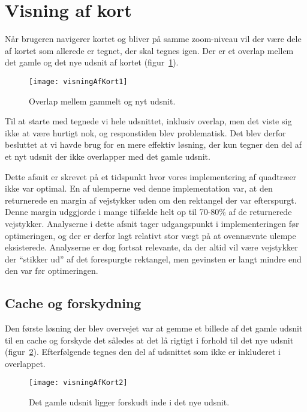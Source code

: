 \section{Visning af kort}
\label{sec:visningAfKort}

Når brugeren navigerer kortet og bliver på samme zoom-niveau vil der være dele af kortet som allerede er tegnet, der skal tegnes igen. Der er et overlap mellem det gamle og det nye udsnit af kortet (figur~\ref{figur:visningAfKort1}).

\begin{figure}[h]
	\centering
	\texttt{[image: visningAfKort1]}
	\captionsetup{width=0.8\textwidth}
	\caption{Overlap mellem gammelt og nyt udsnit.}
	\label{figur:visningAfKort1}
\end{figure}

Til at starte med tegnede vi hele udsnittet, inklusiv overlap, men det viste sig ikke at være hurtigt nok, og responstiden blev problematisk. Det blev derfor besluttet at vi havde brug for en mere effektiv løsning, der kun tegner den del af et nyt udsnit der ikke overlapper med det gamle udsnit.

Dette afsnit er skrevet på et tidspunkt hvor vores implementering af quadtræer ikke var optimal. En af ulemperne ved denne implementation var, at den returnerede en margin af vejstykker uden om den rektangel der var efterspurgt. Denne margin udggjorde i mange tilfælde helt op til 70-80\% af de returnerede vejstykker. Analyserne i dette afsnit tager udgangspunkt i implementeringen før optimeringen, og der er derfor lagt relativt stor vægt på at ovennævnte ulempe eksisterede. Analyserne er dog fortsat relevante, da der altid vil være vejstykker der ``stikker ud'' af det forespurgte rektangel, men gevinsten er langt mindre end den var før optimeringen.

\subsection{Cache og forskydning}
\label{subsec:cacheOgForskydning}

Den første løsning der blev overvejet var at gemme et billede af det gamle udsnit til en cache og forskyde det således at det lå rigtigt i forhold til det nye udsnit (figur~\ref{figur:visningAfKort2}). Efterfølgende tegnes den del af udsnittet som ikke er inkluderet i overlappet.

\begin{figure}[h]
	\centering
	\texttt{[image: visningAfKort2]}
	\captionsetup{width=0.8\textwidth}
	\caption{Det gamle udsnit ligger forskudt inde i det nye udsnit.}
	\label{figur:visningAfKort2}
\end{figure}

